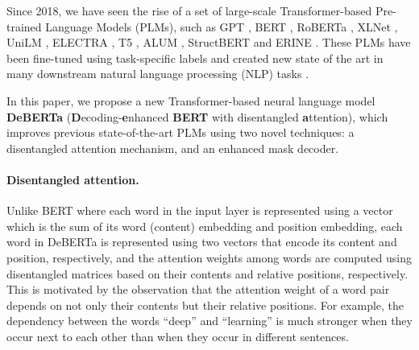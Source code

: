 Since 2018, we have seen the rise of a set of large-scale Transformer-based Pre-trained Language Models (PLMs), such as 
GPT \citep{radford2019language,brown2020language},
BERT \citep{devlin2018bert}, 
RoBERTa \citep{liu2019roberta}, 
XLNet \citep{yang2019xlnet}, 
UniLM \citep{dong2019unilm},
ELECTRA \citep{clark2020electra},
T5 \citep{raffel2019t5},
ALUM \citep{liu2020alum},
StructBERT \citep{wang2019structbert} and
ERINE \citep{sun2019ernie}
. 
These PLMs have been fine-tuned using task-specific labels and created new state of the art in
many downstream natural language processing (NLP) tasks \citep{liu2019mt-dnn,minaee2020deep, jiang2019smart,he2019hnn,he2019x,shen2020exploiting}. 

In this paper, we propose a new Transformer-based neural language model \textbf{DeBERTa} (\textbf{D}ecoding-\textbf{e}nhanced \textbf{BERT} with disentangled \textbf{a}ttention), which 
improves previous state-of-the-art PLMs using two novel techniques: a disentangled attention mechanism, and an enhanced mask decoder.

\paragraph{Disentangled attention.}
Unlike BERT where each word in the input layer is represented using a vector which is the sum of its word (content) embedding and position embedding, each word in DeBERTa is represented using two vectors that encode its content and position, respectively, and the attention weights among words are computed using disentangled matrices based on their contents and relative positions, respectively. This is motivated by the observation that the attention weight of a word pair depends on not only their contents but their relative positions. For example, the dependency between the words ``deep'' and ``learning'' is much stronger when they occur next to each other than when they occur in different sentences. 

